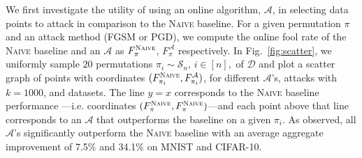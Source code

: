 We first investigate the utility of using an online algorithm, $\mathcal{A}$, in selecting data points to attack in comparison to the \textsc{Naive} baseline. For a given permutation $\pi$ and an attack method (FGSM or PGD), we compute the online fool rate of the \textsc{Naive} baseline and an $\mathcal{A}$ as $F^{\textsc{Naive}}_\pi$, $F^{\mathcal{A}}_\pi$ respectively. In Fig.~\ref{fig:scatter}, we uniformly sample $20$ permutations $\pi_i \sim \mathcal{S}_n, \, i \in [n],$ of $\mathcal{D}$ and plot a scatter graph of points with coordinates $(F^{\textsc{Naive}}_{\pi_i}, F^{\mathcal{A}}_{\pi_i})$, for different $\mathcal{A}$'s, attacks with $k=1000$, and datasets. The line $y=x$ corresponds to the \textsc{Naive} baseline performance ---i.e. coordinates $(F^{\textsc{Naive}}_\pi, F^{\textsc{Naive}}_\pi)$---and each point above that line corresponds to an $\mathcal{A}$ that outperforms the baseline on a given $\pi_i$. As observed, all $\mathcal{A}$'s significantly outperform the \textsc{Naive} baseline with an average aggregate improvement of 7.5\% and 34.1\% on MNIST and CIFAR-10.


